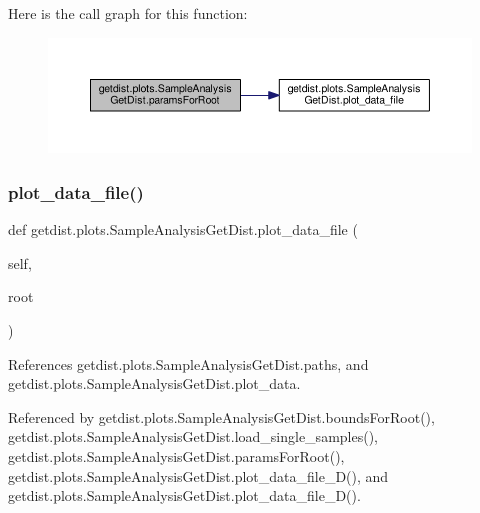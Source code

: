 Here is the call graph for this function\+:
\nopagebreak
\begin{figure}[H]
\begin{center}
\leavevmode
\includegraphics[width=350pt]{classgetdist_1_1plots_1_1SampleAnalysisGetDist_ab202e900c09abf868d57584be3cab79a_cgraph}
\end{center}
\end{figure}
\mbox{\label{classgetdist_1_1plots_1_1SampleAnalysisGetDist_a286b765eded460a2bdd3327526c0d1e1}} 
\subsubsection{\texorpdfstring{plot\+\_\+data\+\_\+file()}{plot\_data\_file()}}
{\footnotesize\ttfamily def getdist.\+plots.\+Sample\+Analysis\+Get\+Dist.\+plot\+\_\+data\+\_\+file (\begin{DoxyParamCaption}\item[{}]{self,  }\item[{}]{root }\end{DoxyParamCaption})}



References getdist.\+plots.\+Sample\+Analysis\+Get\+Dist.\+paths, and getdist.\+plots.\+Sample\+Analysis\+Get\+Dist.\+plot\+\_\+data.



Referenced by getdist.\+plots.\+Sample\+Analysis\+Get\+Dist.\+bounds\+For\+Root(), getdist.\+plots.\+Sample\+Analysis\+Get\+Dist.\+load\+\_\+single\+\_\+samples(), getdist.\+plots.\+Sample\+Analysis\+Get\+Dist.\+params\+For\+Root(), getdist.\+plots.\+Sample\+Analysis\+Get\+Dist.\+plot\+\_\+data\+\_\+file\+\_\+D(), and getdist.\+plots.\+Sample\+Analysis\+Get\+Dist.\+plot\+\_\+data\+\_\+file\+\_\+D().

